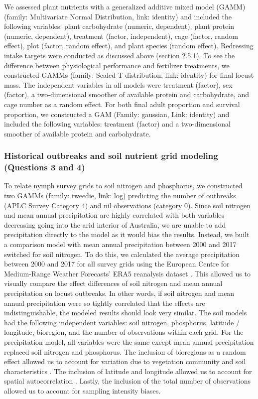 \documentclass[
]{article}
\begin{document}
We assessed plant nutrients with a generalized additive mixed model
(GAMM) (family: Multivariate Normal Distribution, link: identity) and
included the following variables: plant carbohydrate (numeric,
dependent), plant protein (numeric, dependent), treatment (factor,
independent), cage (factor, random effect), plot (factor, random
effect), and plant species (random effect). Redressing intake targets
were conducted as discussed above (section 2.5.1). To see the difference
between physiological performance and fertilizer treatments, we
constructed GAMMs (family: Scaled T distribution, link: identity) for
final locust mass. The independent variables in all models were
treatment (factor), sex (factor), a two-dimensional smoother of
available protein and carbohydrate, and cage number as a random effect.
For both final adult proportion and survival proportion, we constructed
a GAM (Family: gaussian, Link: identity) and included the following
variables: treatment (factor) and a two-dimensional smoother of
available protein and carbohydrate.

\subsubsection{Historical outbreaks and soil nutrient grid modeling
(Questions 3 and
4)}\label{historical-outbreaks-and-soil-nutrient-grid-modeling-questions-3-and-4}

To relate nymph survey grids to soil nitrogen and phosphorus, we
constructed two GAMMs (family: tweedie, link: log) predicting the number
of outbreaks (APLC Survey Category 4) and nil observations (category 0).
Since soil nitrogen and mean annual precipitation are highly correlated
with both variables decreasing going into the arid interior of
Australia, we are unable to add precipitation directly to the model as
it would bias the results. Instead, we built a comparison model with
mean annual precipitation between 2000 and 2017 switched for soil
nitrogen. To do this, we calculated the average precipitation between
2000 and 2017 for all survey grids using the European Centre for
Medium-Range Weather Forecasts' ERA5 reanalysis dataset
\citep{munoz-sabater_era5-land_2021}. This allowed us to visually
compare the effect differences of soil nitrogen and mean annual
precipitation on locust outbreaks. In other words, if soil nitrogen and
mean annual precipitation were so tightly correlated that the effects
are indistinguishable, the modeled results should look very similar. The
soil models had the following independent variables: soil nitrogen,
phosphorus, latitude / longitude, bioregion, and the number of
observations within each grid. For the precipitation model, all
variables were the same except mean annual precipitation replaced soil
nitrogen and phosphorus. The inclusion of bioregions as a random effect
allowed us to account for variation due to vegetation community and soil
characteristics \citep{lawton_seeing_2022}. The inclusion of latitude
and longitude allowed us to account for spatial autocorrelation
\citep{clayton_spatial_1993}. Lastly, the inclusion of the total number
of observations allowed us to account for sampling intensity biases.
\end{document}
